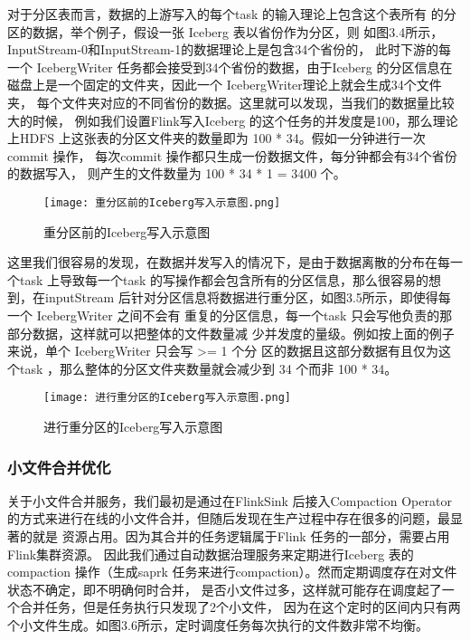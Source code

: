 对于分区表而言，数据的上游写入的每个task 的输入理论上包含这个表所有
的分区的数据，举个例子，假设一张 Iceberg 表以省份作为分区，则
如图3.4所示，InputStream-0和InputStream-1的数据理论上是包含34个省份的，
此时下游的每一个 IcebergWriter 任务都会接受到34个省份的数据，由于Iceberg
的分区信息在磁盘上是一个固定的文件夹，因此一个 IcebergWriter理论上就会生成34个文件夹，
每个文件夹对应的不同省份的数据。这里就可以发现，当我们的数据量比较大的时候，
例如我们设置Flink写入Iceberg 的这个任务的并发度是100，那么理论上HDFS
上这张表的分区文件夹的数量即为 100 * 34。假如一分钟进行一次commit 操作，
每次commit 操作都只生成一份数据文件，每分钟都会有34个省份的数据写入，
则产生的文件数量为 100 * 34 * 1 = 3400 个。

\begin{figure}[h]
  \centering
  \texttt{[image: 重分区前的Iceberg写入示意图.png]}
  \caption{重分区前的Iceberg写入示意图}
  \label{fig:badge}
\end{figure}

这里我们很容易的发现，在数据并发写入的情况下，是由于数据离散的分布在每一个task
上导致每一个task 的写操作都会包含所有的分区信息，那么很容易的想到，在inputStream
后针对分区信息将数据进行重分区，如图3.5所示，即使得每一个 IcebergWriter 之间不会有
重复的分区信息，每一个task 只会写他负责的那部分数据，这样就可以把整体的文件数量减
少并发度的量级。例如按上面的例子来说，单个 IcebergWriter 只会写 >= 1 个分
区的数据且这部分数据有且仅为这个task ，那么整体的分区文件夹数量就会减少到 34 个而非 100 * 34。

\begin{figure}[h]
  \centering
  \texttt{[image: 进行重分区的Iceberg写入示意图.png]}
  \caption{进行重分区的Iceberg写入示意图}
  \label{fig:badge}
\end{figure}

\subsubsection{小文件合并优化}

关于小文件合并服务，我们最初是通过在FlinkSink 后接入Compaction Operator
的方式来进行在线的小文件合并，但随后发现在生产过程中存在很多的问题，最显著的就是
资源占用。因为其合并的任务逻辑属于Flink 任务的一部分，需要占用Flink集群资源。
因此我们通过自动数据治理服务来定期进行Iceberg 表的compaction 操作（生成saprk
任务来进行compaction）。然而定期调度存在对文件状态不确定，即不明确何时合并，
是否小文件过多，这样就可能存在调度起了一个合并任务，但是任务执行只发现了2个小文件，
因为在这个定时的区间内只有两个小文件生成。如图3.6所示，定时调度任务每次执行的文件数非常不均衡。

